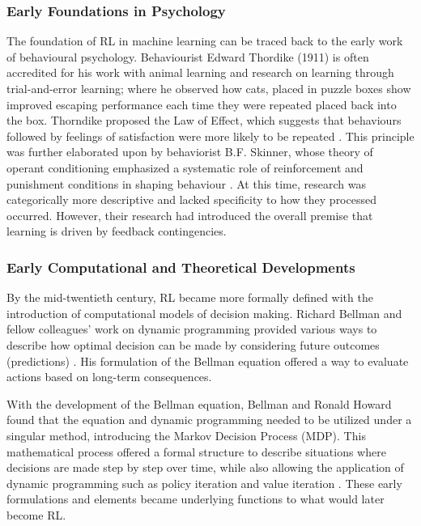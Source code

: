 \documentclass[
  authoryear,
  preprint]{elsarticle}
\begin{document}
\subsubsection{Early Foundations in
Psychology}\label{early-foundations-in-psychology}

The foundation of RL in machine learning can be traced back to the early
work of behavioural psychology. Behaviourist Edward Thordike (1911) is
often accredited for his work with animal learning and research on
learning through trial-and-error learning; where he observed how cats,
placed in puzzle boxes show improved escaping performance each time they
were repeated placed back into the box. Thorndike proposed the Law of
Effect, which suggests that behaviours followed by feelings of
satisfaction were more likely to be repeated
\citep{Thorndike1898, SuttonBarto2020}. This principle was further
elaborated upon by behaviorist B.F. Skinner, whose theory of operant
conditioning emphasized a systematic role of reinforcement and
punishment conditions in shaping behaviour \citep{Skinner1938}. At this
time, research was categorically more descriptive and lacked specificity
to how they processed occurred. However, their research had introduced
the overall premise that learning is driven by feedback contingencies.

\subsubsection{Early Computational and Theoretical
Developments}\label{early-computational-and-theoretical-developments}

By the mid-twentieth century, RL became more formally defined with the
introduction of computational models of decision making. Richard Bellman
and fellow colleagues' work on dynamic programming provided various ways
to describe how optimal decision can be made by considering future
outcomes (predictions) \citep{Bellman1957, SuttonBarto2020}. His
formulation of the Bellman equation offered a way to evaluate actions
based on long-term consequences.

With the development of the Bellman equation, Bellman and Ronald Howard
found that the equation and dynamic programming needed to be utilized
under a singular method, introducing the Markov Decision Process (MDP).
This mathematical process offered a formal structure to describe
situations where decisions are made step by step over time, while also
allowing the application of dynamic programming such as policy iteration
and value iteration \citep{SuttonBarto2020, Suf2026}. These early
formulations and elements became underlying functions to what would
later become RL.
\end{document}
